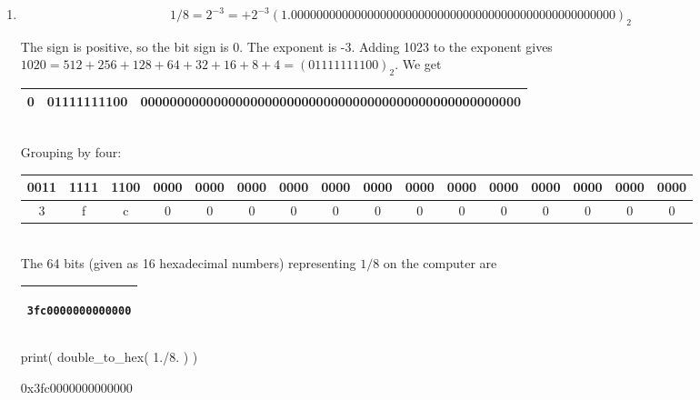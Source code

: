 \documentclass[pdftex,11pt]{article}
\begin{document}
\begin{enumerate}
\begin{comment}

\underline{Matlab Check}:
\begin{verbatim}

>> format hex; 21, format

ans =

   4035000000000000

\end{verbatim}

\end{comment}

\item 
$$ 1/8 = 2^{-3} = + 2^{-3} (1.000000000000000000000000000000000000000000000000000)_2 $$

The sign is positive, so the bit sign is $0$.
The exponent is -3. Adding 1023 to the exponent gives $1020 =
512+256+128+64+32+16+8+4 = (01111111100)_2.$
We get\\

\begin{tabular}{|c|c|c|}
\hline
0 & 01111111100 & 0000000000000000000000000000000000000000000000000000 \\
\hline
\end{tabular}\\

Grouping by four:\\

\begin{tabular}{|c|c|c|c|c|c|c|c|c|c|c|c|c|c|c|c|}
\hline
0011&1111&1100&0000&0000&0000&0000&0000&0000&0000&0000&0000&0000&0000&0000&0000 \\
\hline
3&f&c&0&0&0&0&0&0&0&0&0&0&0&0&0\\
\hline
\end{tabular}\\

The 64 bits (given as 16 hexadecimal numbers) representing $1/8$ on the computer are
\begin{center}
\begin{tabular}{|c|}
\hline
\begin{minipage}{0.17\textwidth}
\begin{verbatim}
3fc0000000000000
\end{verbatim}
\end{minipage}\\
\hline
\end{tabular}
\end{center}



\begin{python}
print( double_to_hex( 1./8. ) )
\end{python}
\begin{pythonoutput}
0x3fc0000000000000
\end{pythonoutput}





\end{enumerate}
\end{document}
